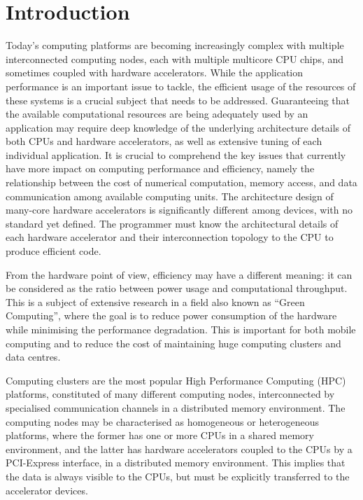 
\chapter{Introduction}
\label{introduction}

Today's computing platforms are becoming increasingly complex with multiple interconnected computing nodes, each with multiple multicore CPU chips, and sometimes coupled with hardware accelerators. While the application performance is an important issue to tackle, the efficient usage of the resources of these systems is a crucial subject that needs to be addressed. Guaranteeing that the available computational resources are being adequately used by an application may require deep knowledge of the underlying architecture details of both CPUs and hardware accelerators, as well as extensive tuning of each individual application. It is crucial to comprehend the key issues that currently have more impact on computing performance and efficiency, namely the relationship between the cost of numerical computation, memory access, and data communication among available computing units. The architecture design of many-core hardware accelerators is significantly different among devices, with no standard yet defined. The programmer must know the architectural details of each hardware accelerator and their interconnection topology to the CPU to produce efficient code.

From the hardware point of view, efficiency may have a different meaning: it can be considered as the ratio between power usage and computational throughput. This is a subject of extensive research in a field also known as ``Green Computing'', where the goal is to reduce power consumption of the hardware while minimising the performance degradation. This is important for both mobile computing and to reduce the cost of maintaining huge computing clusters and data centres.

Computing clusters are the most popular High Performance Computing (HPC) platforms, constituted of many different computing nodes, interconnected by specialised communication channels in a distributed memory environment. The computing nodes may be characterised as homogeneous or heterogeneous platforms, where the former has one or more CPUs in a shared memory environment, and the latter has hardware accelerators coupled to the CPUs by a PCI-Express interface, in a distributed memory environment. This implies that the data is always visible to the CPUs, but must be explicitly transferred to the accelerator devices.

